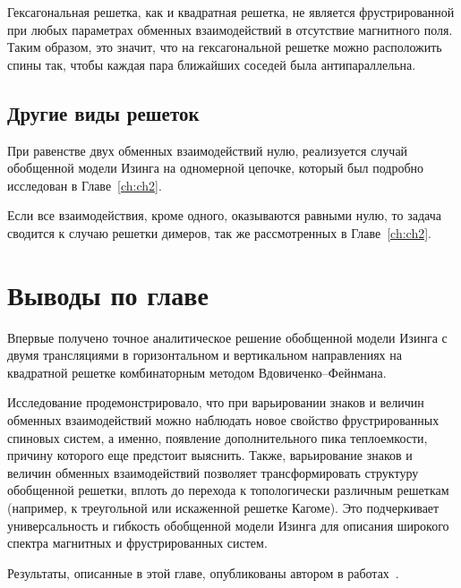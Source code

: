 Гексагональная решетка, как и квадратная решетка, не является фрустрированной при любых параметрах обменных взаимодействий в отсутствие магнитного поля. Таким образом, это значит, что на гексагональной решетке можно расположить спины так, чтобы каждая пара ближайших соседей была антипараллельна.

\subsection{Другие виды решеток}

При равенстве двух обменных взаимодействий нулю, реализуется случай обобщенной модели Изинга на одномерной цепочке, который был подробно исследован в Главе~\ref{ch:ch2}.

Если все взаимодействия, кроме одного, оказываются равными нулю, то задача сводится к случаю решетки димеров, так же рассмотренных в Главе~\ref{ch:ch2}.


\section{Выводы по главе}

Впервые получено точное аналитическое решение обобщенной модели Изинга с двумя трансляциями в горизонтальном и вертикальном направлениях на квадратной решетке комбинаторным методом Вдовиченко--Фейнмана. 

Исследование продемонстрировало, что при варьировании знаков и величин обменных взаимодействий можно наблюдать новое свойство фрустрированных спиновых систем, а именно, появление дополнительного пика теплоемкости, причину которого еще предстоит выяснить. Также, варьирование знаков и величин обменных взаимодействий позволяет трансформировать структуру обобщенной решетки, вплоть до перехода к топологически различным решеткам (например, к треугольной или искаженной решетке Кагоме). Это подчеркивает универсальность и гибкость обобщенной модели Изинга для описания широкого спектра магнитных и фрустрированных систем.

Результаты, описанные в этой главе, опубликованы автором в работах~\cite{confbib7, confbib8, scbib2}.

\FloatBarrier